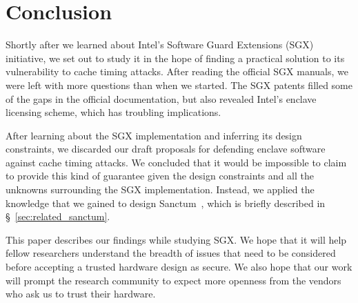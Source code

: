 \section{Conclusion}

Shortly after we learned about Intel's Software Guard Extensions
(SGX) initiative, we set out to study it in the hope of finding a practical
solution to its vulnerability to cache timing attacks. After reading the
official SGX manuals, we were left with more questions than when we started.
The SGX patents filled some of the gaps in the official documentation, but also
revealed Intel's enclave licensing scheme, which has troubling implications.

After learning about the SGX implementation and inferring its design
constraints, we discarded our draft proposals for defending enclave software
against cache timing attacks. We concluded that it would be impossible to claim
to provide this kind of guarantee given the design constraints and all the
unknowns surrounding the SGX implementation. Instead, we applied the knowledge
that we gained to design Sanctum~\cite{costan2015sanctum}, which is briefly
described in \S~\ref{sec:related_sanctum}.

This paper describes our findings while studying SGX. We hope that it will help
fellow researchers understand the breadth of issues that need to be considered
before accepting a trusted hardware design as secure. We also hope that our
work will prompt the research community to expect more openness from the
vendors who ask us to trust their hardware.
